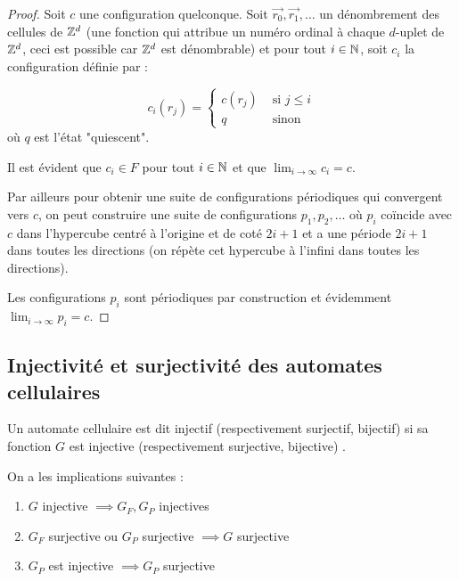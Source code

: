 \begin{proof}
	Soit $c$ une configuration quelconque. Soit $\vec {r_0}, \vec {r_1},\ldots$ un dénombrement des cellules de $\mathbb{Z}^d$ (\cad une fonction
	qui attribue un numéro ordinal à chaque $d$-uplet de  $\mathbb{Z}^d$, ceci est possible car  $\mathbb{Z}^d$ est dénombrable)  et pour tout $i \in \mathbb{N}$,
	soit $c_i$ la configuration définie par :

	$$ c_i(r_j) = \left\{ \begin{array}{ll}
			c(r_j) & \text{ si } j \leq i \\
			q      & \text{ sinon }
		\end{array}
		\right.$$
	où $q$ est l'état "quiescent".

	Il est évident que $c_i \in F$ pour tout $i \in \mathbb{N}$ et que $\lim_{i \to \infty} c_i = c$.

	Par ailleurs pour obtenir une suite de configurations périodiques qui convergent vers $c$, on peut construire une suite de configurations
	$p_1, p_2, \ldots $ où $p_i$ coïncide avec $c$ dans l'hypercube centré à l'origine et de coté $2i + 1$ et a une
	période $2i + 1$ dans toutes les directions (on répète cet hypercube à l'infini dans toutes les directions).

	Les configurations $p_i$ sont  périodiques  par construction et  évidemment $\lim_{i \to \infty} p_i = c$.
\end{proof}

\subsection{Injectivité et surjectivité des automates cellulaires}

\begin{definition}
	Un automate cellulaire est dit injectif (respectivement surjectif, bijectif)
	si sa fonction $G$ est injective  (respectivement surjective, bijective)
	.
\end{definition}


\begin{theorem} \label{thm:troisprops}
	On a les implications suivantes :
	\begin{enumerate}
		\item $G$ injective $\implies G_F, G_P$ injectives \label{thm:big1}
		\item  $G_F$  surjective ou $G_P$  surjective $\implies G$ surjective \label{thm:big2}
		\item  $G_P$ est injective $\implies G_P$ surjective \label{thm:big3}
	\end{enumerate}
\end{theorem}

